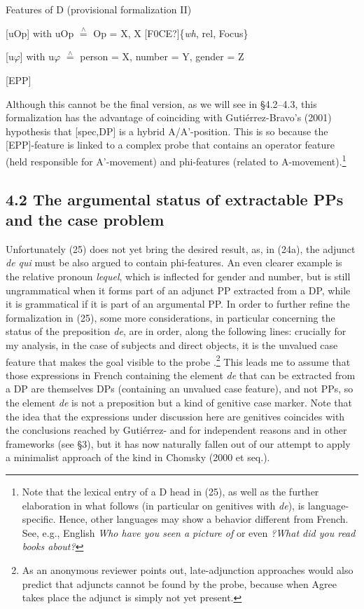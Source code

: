 \documentclass[output=paper]{langsci/langscibook}
\begin{document}
\ea%
    \label{ex:key:25}
    \gll\\
        \\
    \glt
    \z

            Features of D (provisional formalization II)

    [uOp]      with uOp $\stackrel{\wedge}{=}$ Op = X, X [F0CE?]\{\textit{wh}, rel, Focus\}

    [u$\varphi $]      with u$\varphi $ $\stackrel{\wedge}{=}$ person = X, number = Y, gender = Z

        {\textbar}

    [EPP]

Although this cannot be the final version, as we will see in §4.2–4.3, this formalization has the advantage of coinciding with Gutiérrez-Bravo’s (2001) hypothesis that [spec,DP] is a hybrid A/A’-position. This is so because the [EPP]-feature is linked to a complex probe that contains an operator feature (held responsible for A’-movement) and phi-features (related to A-movement).\footnote{Note that the lexical entry of a D head in (25), as well as the further elaboration in what follows (in particular on genitives with \textit{de}), is language-specific. Hence, other languages may show a behavior different from French. See, e.g., English \textit{Who have you seen a picture of} or even \textit{?What did you read books about?}}

\subsection{ 4.2 The argumental status of extractable PPs and the case problem}

Unfortunately (25) does not yet bring the desired result, as, in (24a), the adjunct \textit{de qui} must be also argued to contain phi-features. An even clearer example is the relative pronoun \textit{lequel}, which is inflected for gender and number, but is still ungrammatical when it forms part of an adjunct PP extracted from a DP, while it is grammatical if it is part of an argumental PP. In order to further refine the formalization in (25), some more considerations, in particular concerning the status of the preposition \textit{de}, are in order, along the following lines: crucially for my analysis, in the case of subjects and direct objects, it is the unvalued case feature that makes the goal visible to the probe \citep[123]{Chomsky2000}.\footnote{As an anonymous reviewer points out, late-adjunction approaches would also predict that adjuncts cannot be found by the probe, because when Agree takes place the adjunct is simply not yet present.} This leads me to assume that those expressions in French containing the element \textit{de} that can be extracted from a DP are themselves DPs (containing an unvalued case feature), and not PPs, so the element \textit{de} is not a preposition but a kind of genitive case marker. Note that the idea that the expressions under discussion here are genitives coincides with the conclusions reached by Gutiérrez-\citet{Bravo2001} and \citet{Cinque2014} for independent reasons and in other frameworks (see §3), but it has now naturally fallen out of our attempt to apply a minimalist approach of the kind in Chomsky (2000 et seq.).
\end{document}
